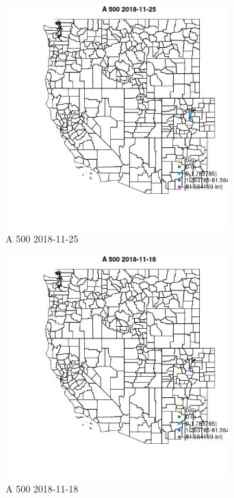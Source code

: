 \begin{figure} 
\centering  
\includegraphics[width=0.77\textwidth]{Code_Outputs/Report_ML_input_PM25_Step4_part_e_de_duplicated_aveswNAs_MapObsA_5002018-11-25.jpg} 
\caption{\label{fig:Report_ML_input_PM25_Step4_part_e_de_duplicated_aveswNAsMapObsA_5002018-11-25}A 500 2018-11-25} 
\end{figure} 
 

\begin{figure} 
\centering  
\includegraphics[width=0.77\textwidth]{Code_Outputs/Report_ML_input_PM25_Step4_part_e_de_duplicated_aveswNAs_MapObsA_5002018-11-18.jpg} 
\caption{\label{fig:Report_ML_input_PM25_Step4_part_e_de_duplicated_aveswNAsMapObsA_5002018-11-18}A 500 2018-11-18} 
\end{figure} 
 

